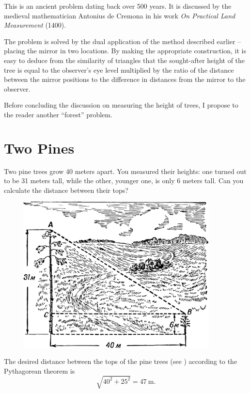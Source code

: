 \ans This is an ancient problem dating back over 500 years. It is discussed by the medieval mathematician Antonius de Cremona in his work \emph{On Practical Land Measurement} (1400).


The problem is solved by the dual application of the method described earlier -- placing the mirror in two locations. By making the appropriate construction, it is easy to deduce from the similarity of triangles that the sought-after height of the tree is equal to the observer's eye level multiplied by the ratio of the distance between the mirror positions to the difference in distances from the mirror to the observer.

Before concluding the discussion on measuring the height of trees, I propose to the reader another ``forest'' problem.

\clearpage

\section{Two Pines}
\label{sec-1.9}


\ques Two pine trees grow 40 meters apart. You measured their heights: one turned out to be 31 meters tall, while the other, younger one, is only 6 meters tall. Can you calculate the distance between their tops?

\begin{figure}[h!]
\centering
\includegraphics[width=0.9\textwidth]{figures/ch-01/fig-01-16.pdf}
\end{figure}

\ans The desired distance between the tops of the pine trees (see ) according to the Pythagorean theorem is
\begin{equation*}%
\sqrt{40^{2} + 25^{2}} = \SI{47}{\meter}.
\end{equation*}



